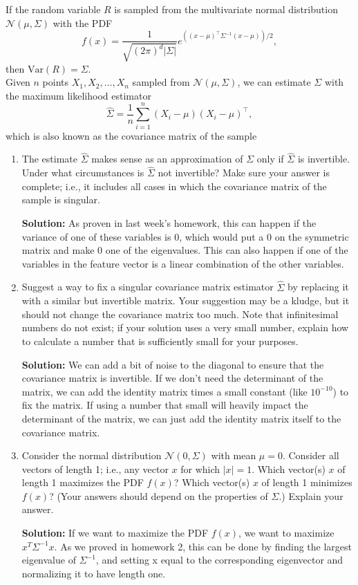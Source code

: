 \documentclass{article}
\newcommand{\solution}{\textbf{Solution: }}
\newcommand{\N}{\mathcal{N}}
\newcommand{\Var}{\text{Var}}
\begin{document}
\noindent
If the random variable $R$ is sampled from the multivariate normal distribution $\N(\mu, \Sigma)$ with the PDF
$$ f(x) = \frac{1}{\sqrt{(2\pi)^d |\Sigma|}} e^{((x-\mu)^{\top}\Sigma^{-1}(x-\mu))/2},$$
then $\Var(R) = \Sigma$.\\

\noindent
Given $n$ points $X_1, X_2, \ldots, X_n$ sampled from $\N(\mu, \Sigma)$, we can estimate $\Sigma$ with the maximum likelihood estimator
$$ \hat{\Sigma} = \frac{1}{n} \sum_{i=1}^n (X_i - \mu)(X_i - \mu)^{\top},$$ which is also known as the covariance matrix of the sample
\begin{enumerate}[label=(\alph*)]
    \item The estimate $\hat{\Sigma}$ makes sense as an approximation of $\Sigma$ only if $\hat{\Sigma}$ is invertible. Under what circumstances is $\hat{\Sigma}$ not invertible? Make sure your answer is complete; i.e., it includes all cases in which the covariance matrix of the sample is singular.
    \begin{mdframed} \solution
    As proven in last week's homework, this can happen if the variance of one of these variables is 0, which would put a 0 on the symmetric matrix and make 0 one of the eigenvalues. This can also happen if one of the variables in the feature vector is a linear combination of the other variables.
    \end{mdframed}
    
    \item Suggest a way to fix a singular covariance matrix estimator $\hat{\Sigma}$ by replacing it with a similar but invertible matrix. Your suggestion may be a kludge, but it should not change the covariance matrix too much. Note that infinitesimal numbers do not exist; if your solution uses a very small number, explain how to calculate a number that is sufficiently small for your purposes.
    \begin{mdframed} \solution
    We can add a bit of noise to the diagonal to ensure that the covariance matrix is invertible. If we don't need the determinant of the matrix, we can add the identity matrix times a small constant (like $10^{-10}$) to fix the matrix. If using a number that small will heavily impact the determinant of the matrix, we can just add the identity matrix itself to the covariance matrix.
    \end{mdframed}
    
    \item Consider the normal distribution $\N(0, \Sigma)$ with mean $\mu = 0$. Consider all vectors of length 1; i.e., any vector $x$ for which $|x| =1$. Which vector(s) $x$ of length 1 maximizes the PDF $f(x)$? Which vector(s) $x$ of length 1 minimizes $f(x)$? (Your answers should depend on the properties of $\Sigma$.) Explain your answer.
    \begin{mdframed} \solution
    If we want to maximize the PDF $f(x)$, we want to maximize $x^T\Sigma^{-1}x$. As we proved in homework 2, this can be done by finding the largest eigenvalue of $\Sigma^{-1}$, and setting x equal to the corresponding eigenvector and normalizing it to have length one.
    

\end{mdframed}
\end{enumerate}
\end{document}
